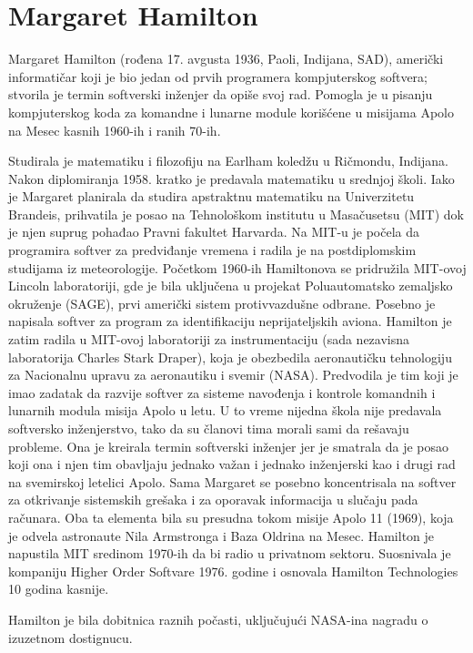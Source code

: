 \documentclass[a4paper,12pt]{article}
\begin{document}
\newpage
\section{Margaret Hamilton}

\begin{flushleft}
 Margaret Hamilton (rođena 17. avgusta 1936, Paoli, Indijana, SAD), američki informatičar koji je bio jedan od prvih programera kompjuterskog softvera; stvorila je termin softverski inženjer da opiše svoj rad. Pomogla je u pisanju kompjuterskog koda za komandne i lunarne module korišćene u misijama Apolo na Mesec kasnih 1960-ih i ranih 70-ih.

    Studirala je matematiku i filozofiju na Earlham koledžu u Ričmondu, Indijana. Nakon diplomiranja 1958. kratko je predavala matematiku u srednjoj školi. Iako je Margaret planirala da studira apstraktnu matematiku na Univerzitetu Brandeis, prihvatila je posao na Tehnološkom institutu u Masačusetsu (MIT) dok je njen suprug pohađao Pravni fakultet Harvarda. Na MIT-u je počela da programira softver za predviđanje vremena i radila je na postdiplomskim studijama iz meteorologije.
    Početkom 1960-ih Hamiltonova se pridružila MIT-ovoj Lincoln laboratoriji, gde je bila uključena u projekat Poluautomatsko zemaljsko okruženje (SAGE), prvi američki sistem protivvazdušne odbrane. Posebno je napisala softver za program za identifikaciju neprijateljskih aviona. Hamilton je zatim radila u MIT-ovoj laboratoriji za instrumentaciju (sada nezavisna laboratorija Charles Stark Draper), koja je obezbedila aeronautičku tehnologiju za Nacionalnu upravu za aeronautiku i svemir (NASA). Predvodila je tim koji je imao zadatak da razvije softver za sisteme navođenja i kontrole komandnih i lunarnih modula misija Apolo u letu. U to vreme nijedna škola nije predavala softversko inženjerstvo, tako da su članovi tima morali sami da rešavaju probleme. Ona je kreirala termin softverski inženjer jer je smatrala da je posao koji ona i njen tim obavljaju jednako važan i jednako inženjerski kao i drugi rad na svemirskoj letelici Apolo. Sama Margaret se posebno koncentrisala na softver za otkrivanje sistemskih grešaka i za oporavak informacija u slučaju pada računara. Oba ta elementa bila su presudna tokom misije Apolo 11 (1969), koja je odvela astronaute Nila Armstronga i Baza Oldrina na Mesec. Hamilton je napustila MIT sredinom 1970-ih da bi radio u privatnom sektoru. Suosnivala je kompaniju Higher Order Softvare 1976. godine i osnovala Hamilton Technologies 10 godina kasnije.

    Hamilton je bila dobitnica raznih počasti, uključujući NASA-ina nagradu o izuzetnom dostignucu.
    \end{flushleft}
\end{document}
